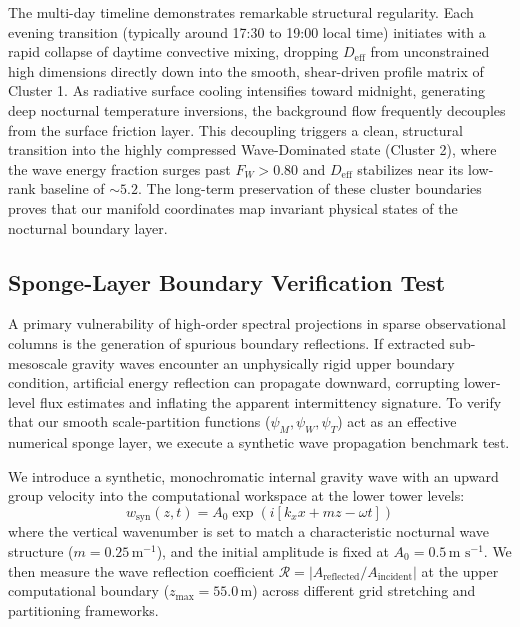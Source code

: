 \documentclass[11pt,a4paper]{article}
\begin{document}
The multi-day timeline demonstrates remarkable structural regularity. Each evening transition (typically around 17:30 to 19:00 local time) initiates with a rapid collapse of daytime convective mixing, dropping $D_{\mathrm{eff}}$ from unconstrained high dimensions directly down into the smooth, shear-driven profile matrix of Cluster 1. As radiative surface cooling intensifies toward midnight, generating deep nocturnal temperature inversions, the background flow frequently decouples from the surface friction layer. This decoupling triggers a clean, structural transition into the highly compressed Wave-Dominated state (Cluster 2), where the wave energy fraction surges past $F_W > 0.80$ and $D_{\mathrm{eff}}$ stabilizes near its low-rank baseline of $\sim 5.2$. The long-term preservation of these cluster boundaries proves that our manifold coordinates map invariant physical states of the nocturnal boundary layer.

\subsection{Sponge-Layer Boundary Verification Test}
\label{sec:results:sponge}

A primary vulnerability of high-order spectral projections in sparse observational columns is the generation of spurious boundary reflections. If extracted sub-mesoscale gravity waves encounter an unphysically rigid upper boundary condition, artificial energy reflection can propagate downward, corrupting lower-level flux estimates and inflating the apparent intermittency signature. To verify that our smooth scale-partition functions ($\psi_M, \psi_W, \psi_T$) act as an effective numerical sponge layer, we execute a synthetic wave propagation benchmark test.

We introduce a synthetic, monochromatic internal gravity wave with an upward group velocity into the computational workspace at the lower tower levels:
\begin{equation}
w_{\mathrm{syn}}(z, t) = A_0 \exp(i [k_x x + m z - \omega t])
\label{eq:wave_syn}
\end{equation}
where the vertical wavenumber is set to match a characteristic nocturnal wave structure ($m = 0.25\,\text{m}^{-1}$), and the initial amplitude is fixed at $A_0 = 0.5\,\text{m s}^{-1}$. We then measure the wave reflection coefficient $\mathcal{R} = |A_{\mathrm{reflected}} / A_{\mathrm{incident}}|$ at the upper computational boundary ($z_{\max} = 55.0\,\text{m}$) across different grid stretching and partitioning frameworks.
\end{document}
